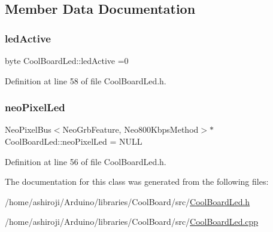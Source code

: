 \subsection{Member Data Documentation}
\mbox{\label{class_cool_board_led_a5f17c135516fcf4b44ea8a096ba0177a}} 
\subsubsection{\texorpdfstring{led\+Active}{ledActive}}
{\footnotesize\ttfamily byte Cool\+Board\+Led\+::led\+Active =0\hspace{0.3cm}{\ttfamily [private]}}



Definition at line 58 of file Cool\+Board\+Led.\+h.

\mbox{\label{class_cool_board_led_ac2c13fa462a010cd9242bf297c013923}} 
\subsubsection{\texorpdfstring{neo\+Pixel\+Led}{neoPixelLed}}
{\footnotesize\ttfamily Neo\+Pixel\+Bus$<$Neo\+Grb\+Feature, Neo800\+Kbps\+Method$>$$\ast$ Cool\+Board\+Led\+::neo\+Pixel\+Led = N\+U\+LL\hspace{0.3cm}{\ttfamily [private]}}



Definition at line 56 of file Cool\+Board\+Led.\+h.



The documentation for this class was generated from the following files\+:\begin{DoxyCompactItemize}
\item 
/home/ashiroji/\+Arduino/libraries/\+Cool\+Board/src/\hyperlink{_cool_board_led_8h}{Cool\+Board\+Led.\+h}\item 
/home/ashiroji/\+Arduino/libraries/\+Cool\+Board/src/\hyperlink{_cool_board_led_8cpp}{Cool\+Board\+Led.\+cpp}\end{DoxyCompactItemize}
